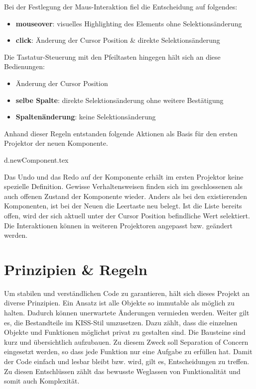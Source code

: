 \noindent
Bei der Festlegung der Maus-Interaktion fiel die Entscheidung auf folgendes:

\begin{itemize}
    \item \textbf{mouseover}: visuelles Highlighting des Elements ohne Selektionsänderung
    \item \textbf{click}: Änderung der Cursor Position \& direkte Selektionsänderung
\end{itemize}

\noindent
Die Tastatur-Steuerung mit den Pfeiltasten hingegen hält sich an diese Bedienungen:

\begin{itemize}
    \item Änderung der Cursor Position
    \item \textbf{selbe Spalte}: direkte Selektionsänderung ohne weitere Bestätigung
    \item \textbf{Spaltenänderung}: keine Selektionsänderung
\end{itemize}

\noindent
Anhand dieser Regeln entstanden folgende Aktionen als Basis für den ersten Projektor der neuen Komponente. 


\clearpage
{d.newComponent.tex}

Das Undo und das Redo auf der Komponente erhält im ersten Projektor keine spezielle Definition.
Gewisse Verhaltensweisen finden sich im geschlossenen als auch offenen Zustand der Komponente wieder.
Anders als bei den existierenden Komponenten, ist bei der Neuen die Leertaste neu belegt. 
Ist die Liste bereits offen, wird der sich aktuell unter der Cursor Position befindliche Wert selektiert.
Die Interaktionen können in weiteren Projektoren angepasst bzw. geändert werden.


\section{Prinzipien \& Regeln}
\label{sec:principleRules}

Um stabilen und verständlichen Code zu garantieren, hält sich dieses Projekt an diverse Prinzipien.
Ein Ansatz ist alle Objekte so immutable als möglich zu halten.
Dadurch können unerwartete Änderungen vermieden werden.
Weiter gilt es, die Bestandteile im KISS-Stil umzusetzen.
Dazu zählt, dass die einzelnen Objekte und Funktionen möglichst privat zu gestalten sind.
Die Bausteine sind kurz und übersichtlich aufzubauen.
Zu diesem Zweck soll Separation of Concern eingesetzt werden, so dass jede Funktion nur eine Aufgabe zu erfüllen hat.
Damit der Code einfach und lesbar bleibt bzw. wird, gilt es, Entscheidungen zu treffen.
Zu diesen Entschlüssen zählt das bewusste Weglassen von Funktionalität und somit auch Komplexität.

